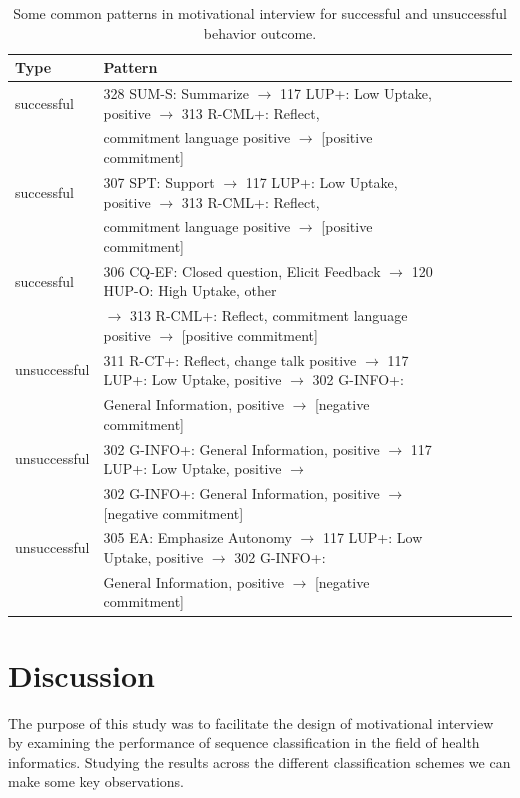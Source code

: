 \documentclass{amia}
\begin{document}
\begin{table}[h]
\centering
\caption{Some common patterns in motivational interview for successful and unsuccessful behavior outcome.}
\label{tab:common_patterns}
  \begin{tabular}{|l|l|l|l|l|l|}
  \hline
   \textbf{Type} & \textbf{Pattern} \\ \hline      
successful & 328 SUM-S: Summarize $\rightarrow $ 117 LUP+: Low Uptake, positive $\rightarrow $ 313 R-CML+: Reflect, \\ 
& commitment language positive $\rightarrow $ [positive commitment] \\\hline
successful & 307 SPT: Support $\rightarrow $ 117 LUP+: Low Uptake, positive $\rightarrow $ 313 R-CML+: Reflect, \\
& commitment language positive $\rightarrow $ [positive commitment] \\\hline
successful & 306 CQ-EF: Closed question, Elicit Feedback $\rightarrow $ 120 HUP-O: High Uptake, other \\
& $\rightarrow $ 313 R-CML+: Reflect, commitment language positive $\rightarrow $ [positive commitment] \\\hline
unsuccessful & 311 R-CT+: Reflect, change talk positive $\rightarrow $ 117 LUP+: Low Uptake, positive $\rightarrow $ 302 G-INFO+:  \\
& General Information, positive $\rightarrow $ [negative commitment] \\\hline
unsuccessful & 302 G-INFO+: General Information, positive $\rightarrow $ 117 LUP+: Low Uptake, positive $\rightarrow $  \\
& 302 G-INFO+: General Information, positive $\rightarrow $ [negative commitment] \\\hline
unsuccessful & 305 EA: Emphasize Autonomy $\rightarrow $ 117 LUP+: Low Uptake, positive $\rightarrow $ 302 G-INFO+:  \\
& General Information, positive $\rightarrow $ [negative commitment] \\\hline
  \end{tabular}
\end{table} 

\section*{Discussion}
The purpose of this study was to facilitate the design of motivational interview by examining the performance of sequence classification in the field of health informatics. Studying the results across the different classification schemes we can make some key observations. 
\end{document}
